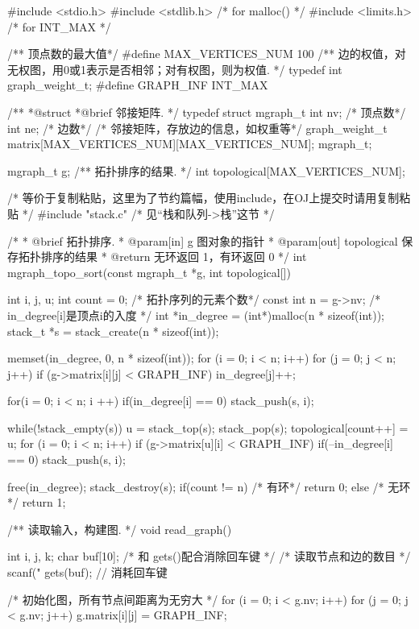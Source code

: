 \begin{Codex}[label=mgraph_topo_sort.c]
#include <stdio.h>
#include <stdlib.h>  /* for malloc() */
#include <limits.h>  /* for INT_MAX */

/** 顶点数的最大值*/
#define MAX_VERTICES_NUM 100
/** 边的权值，对无权图，用0或1表示是否相邻；对有权图，则为权值. */
typedef int graph_weight_t;
#define GRAPH_INF INT_MAX

/**
 *@struct
 *@brief 邻接矩阵.
 */
typedef struct mgraph_t {
    int nv; /* 顶点数*/
    int ne; /* 边数*/
    /* 邻接矩阵，存放边的信息，如权重等*/
    graph_weight_t matrix[MAX_VERTICES_NUM][MAX_VERTICES_NUM];
} mgraph_t;

mgraph_t g;
/** 拓扑排序的结果. */
int topological[MAX_VERTICES_NUM];

/* 等价于复制粘贴，这里为了节约篇幅，使用include，在OJ上提交时请用复制粘贴 */
#include "stack.c"  /* 见“栈和队列->栈”这节 */

/*
  * @brief 拓扑排序.
  * @param[in] g 图对象的指针
  * @param[out] topological 保存拓扑排序的结果
  * @return 无环返回 1，有环返回 0
  */
int mgraph_topo_sort(const mgraph_t *g, int topological[]) {
    int i, j, u;
    int count = 0; /* 拓扑序列的元素个数*/
    const int n = g->nv;
    /* in_degree[i]是顶点i的入度 */
    int *in_degree = (int*)malloc(n * sizeof(int));
    stack_t *s = stack_create(n * sizeof(int));

    memset(in_degree, 0, n * sizeof(int));
    for (i = 0; i < n; i++) {
        for (j = 0; j < n; j++) {
            if (g->matrix[i][j] < GRAPH_INF)
                in_degree[j]++;
        }
    }

    for(i = 0; i < n; i ++) {
        if(in_degree[i] == 0)
            stack_push(s, i);
    }

    while(!stack_empty(s)) {
        u = stack_top(s); stack_pop(s);
        topological[count++] = u;
        for (i = 0; i < n; i++) if (g->matrix[u][i] < GRAPH_INF) {
            if(--in_degree[i] == 0) stack_push(s, i);
        }
    }

    free(in_degree);
    stack_destroy(s);
    if(count != n) { /* 有环*/
        return 0;
    } else { /* 无环*/
        return 1;
    }
}

/** 读取输入，构建图. */
void read_graph() {
    int i, j, k;
    char buf[10]; /* 和 gets()配合消除回车键 */
    /* 读取节点和边的数目 */
    scanf("%
    gets(buf); // 消耗回车键

    /* 初始化图，所有节点间距离为无穷大 */
    for (i = 0; i < g.nv; i++) {
        for (j = 0; j < g.nv; j++) {
            g.matrix[i][j] = GRAPH_INF;
        }
    }

}
\end{Codex}
